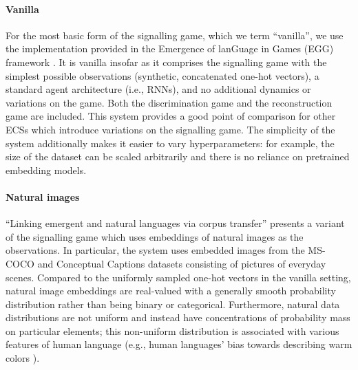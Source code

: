 \paragraph{Vanilla}
For the most basic form of the signalling game, which we term ``vanilla'', we use the implementation provided in the Emergence of lanGuage in Games (EGG) framework \citep[MIT license]{egg}.
It is vanilla insofar as it comprises the signalling game with the simplest possible observations (synthetic, concatenated one-hot vectors), a standard agent architecture (i.e., RNNs), and no additional dynamics or variations on the game.
Both the discrimination game and the reconstruction game are included.
This system provides a good point of comparison for other ECSs which introduce variations on the signalling game.
The simplicity of the system additionally makes it easier to vary hyperparameters: for example, the size of the dataset can be scaled arbitrarily and there is no reliance on pretrained embedding models.

\paragraph{Natural images}
``Linking emergent and natural languages via corpus transfer'' \citep[MIT license]{yao2022linking} presents a variant of the signalling game which uses embeddings of natural images as the observations.
In particular, the system uses embedded images from the MS-COCO and Conceptual Captions datasets consisting of pictures of everyday scenes.
Compared to the uniformly sampled one-hot vectors in the vanilla setting,
  natural image embeddings are real-valued with a generally smooth probability distribution rather than being binary or categorical.
Furthermore, natural data distributions are not uniform  and instead have concentrations of probability mass on particular elements; this non-uniform distribution is associated with various features of human language (e.g., human languages' bias towards describing warm colors \citep{gibson2017color,zaslavsky2018color}).


